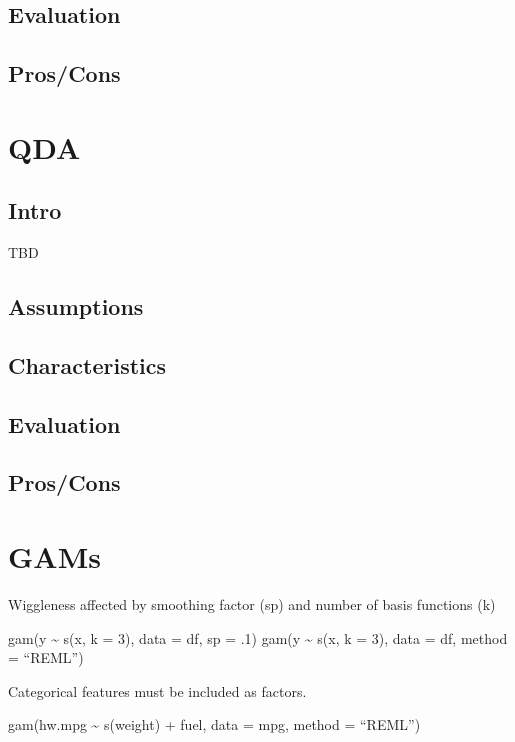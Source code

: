 \documentclass[]{book}
\begin{document}
\subsection{Evaluation}\label{evaluation-11}

\subsection{Pros/Cons}\label{proscons-11}

\section{QDA}\label{qda}

\subsection{Intro}\label{intro-12}

TBD

\subsection{Assumptions}\label{assumptions-12}

\subsection{Characteristics}\label{characteristics-11}

\subsection{Evaluation}\label{evaluation-12}

\subsection{Pros/Cons}\label{proscons-12}

\section{GAMs}\label{gams}

Wiggleness affected by smoothing factor (sp) and number of basis
functions (k)

gam(y \textasciitilde{} s(x, k = 3), data = df, sp = .1) gam(y
\textasciitilde{} s(x, k = 3), data = df, method = ``REML'')

Categorical features must be included as factors.

gam(hw.mpg \textasciitilde{} s(weight) + fuel, data = mpg, method =
``REML'')
\end{document}
